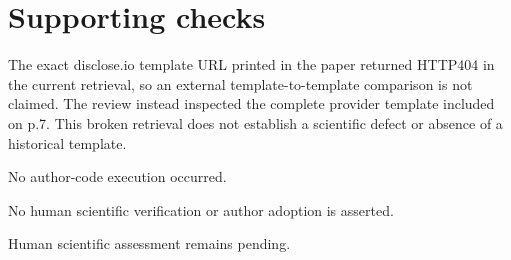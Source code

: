 \documentclass[10pt]{article}
\begin{document}
\section*{Supporting checks}
The exact disclose.io template URL printed in the paper returned HTTP404 in the current retrieval, so an external template-to-template comparison is not claimed. The review instead inspected the complete provider template included on p.7. This broken retrieval does not establish a scientific defect or absence of a historical template.\par
No author-code execution occurred.\par
No human scientific verification or author adoption is asserted.\par
Human scientific assessment remains pending.\par
\end{document}
